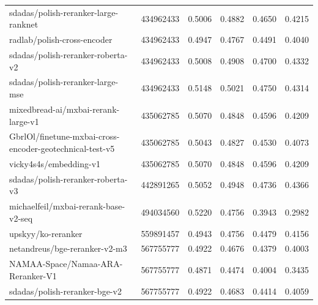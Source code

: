 {\begin{xltabular}{\textwidth}{X rrrrr}
      sdadas/polish-reranker-large-ranknet                                   & 434962433     & 0.5006        & 0.4882        & 0.4650        & 0.4215         \\
      radlab/polish-cross-encoder                                            & 434962433     & 0.4947        & 0.4767        & 0.4491        & 0.4040         \\
      sdadas/polish-reranker-roberta-v2                                      & 434962433     & 0.5008        & 0.4908        & 0.4700        & 0.4332         \\
      sdadas/polish-reranker-large-mse                                       & 434962433     & 0.5148        & 0.5021        & 0.4750        & 0.4314         \\
      mixedbread-ai/mxbai-rerank-large-v1                                    & 435062785     & 0.5070        & 0.4848        & 0.4596        & 0.4209         \\
      GbrlOl/finetune-mxbai-cross-encoder-geotechnical-test-v5               & 435062785     & 0.5043        & 0.4827        & 0.4530        & 0.4073         \\
      vicky4s4s/embedding-v1                                                 & 435062785     & 0.5070        & 0.4848        & 0.4596        & 0.4209         \\
      sdadas/polish-reranker-roberta-v3                                      & 442891265     & 0.5052        & 0.4948        & 0.4736        & 0.4366         \\
      michaelfeil/mxbai-rerank-base-v2-seq                                   & 494034560     & 0.5220        & 0.4756        & 0.3943        & 0.2982         \\
      upskyy/ko-reranker                                                     & 559891457     & 0.4943        & 0.4756        & 0.4479        & 0.4156         \\
      netandreus/bge-reranker-v2-m3                                          & 567755777     & 0.4922        & 0.4676        & 0.4379        & 0.4003         \\
      NAMAA-Space/Namaa-ARA-Reranker-V1                                      & 567755777     & 0.4871        & 0.4474        & 0.4004        & 0.3435         \\
      sdadas/polish-reranker-bge-v2                                          & 567755777     & 0.4922        & 0.4683        & 0.4414        & 0.4059         \\

\end{xltabular}}
